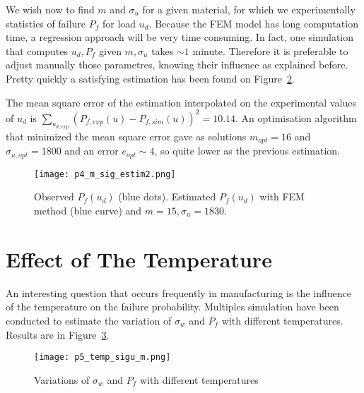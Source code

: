 \documentclass[
10pt, %
a4paper, %
oneside, %
headinclude,footinclude, %
BCOR5mm, %
]{scrartcl}
\begin{document}
\begin{figure}[H]
    \centering
    \hfill
    \label{fig:var-m-sigu}
\end{figure}


We wish now to find $m$ and $\sigma_u$ for a given material, for which
we experimentally statistics of failure $P_f$ for load $u_d$.
Because the FEM model has long computation time, a regression approach
will be very time consuming.
In fact, one simulation that computes
$u_d,P_f$ given $m,\sigma_u$ takes $\sim 1$ minute.
Therefore it is preferable to adjust manually those parametres, knowing
their influence as explained before. Pretty quickly a satisfying
estimation has been found on Figure~\ref{fig:estim-m-sigu}.

The mean square error of the estimation interpolated on the experimental
values of $u_d$ is $\displaystyle \sum_{u_{d,exp}}\left(P_{f,exp}(u) - P_{f,sim}(u)\right)^2 = 10.14$.
An optimisation algorithm that minimized the mean square error gave as solutions $m_{opt}=16$ and $\sigma_{u,opt}=1800$
and an error $e_{opt} \sim 4$, so quite lower as the previous estimation.

\begin{figure}[H]
    \centering
    \texttt{[image: p4\_m\_sig\_estim2.png]}
    \caption{Observed $P_f(u_d)$ (blue dots). Estimated $P_f(u_d)$ with FEM method (blue curve) and $m=15,\sigma_u=1830$.}
    \label{fig:estim-m-sigu}
\end{figure}

\section{Effect of The Temperature}

An interesting question that occurs frequently in manufacturing is the influence of the temperature on the
failure probability. Multiples simulation have been conducted to estimate the variation of $\sigma_w$ and $P_f$
with different temperatures. Results are in Figure~\ref{fig:estim-simw-temp}.

\begin{figure}[H]
    \centering
    \texttt{[image: p5\_temp\_sigu\_m.png]}
    \caption{Variations of $\sigma_w$ and $P_f$
        with different temperatures}
    \label{fig:estim-simw-temp}
\end{figure}
\end{document}
